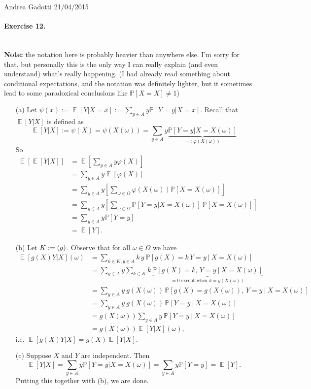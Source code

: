 \documentclass[12pt,a4paper]{report}
\theoremstyle{definition}
\theoremstyle{num.custom-title}
\let\o\relax %
\DeclareMathOperator{\o}{\mathsf{o}}
\let\Im\relax %
\DeclareMathOperator{\Im}{Im}
\DeclareMathOperator{\E}{\mathbb{E}}
\renewcommand{\phi}{\varphi}
\renewcommand{\1}{\mathbbm{1}}
\renewcommand{\P}{\mathbb{P}}
\begin{document}
\noindent Andrea Gadotti \hfill 21/04/2015

\paragraph{Exercise 12.}\ \\
\textbf{Note:} the notation here is probably heavier than anywhere else. I'm sorry for that, but personally this is the only way I can really explain (and even understand) what's really happening. (I had already read something about conditional expectations, and the notation was definitely lighter, but it sometimes lead to some paradoxical conclusions like $\P[X=X] \neq 1$)
\begin{itemize}
\item[(a)] Let $\psi(x) := \E[Y|X=x] := \sum_{y \in A} y \P[Y=y|X=x]$. Recall that $\E[Y|X]$ is defined as
\[
\E[Y|X] := \psi(X) = \psi(X(\omega)) = \sum_{y \in A} y \underbrace{\P[Y=y|X=X(\omega)]}_{=: \phi(X(\omega))} 
\]
So
\begin{align*}
\E[\E[Y|X]]
&= \E \left[ \sum_{y \in A} y \phi(X) \right] \\
&= \sum_{y \in A} y \E \left[ \phi(X) \right] \\
&= \sum_{y \in A} y \left[ \sum_{\omega \in \Omega} \phi(X(\omega)) \P[X=X(\omega)] \right]  \tag{law unconsc. statistician} \\
&= \sum_{y \in A} y \left[ \sum_{\omega \in \Omega} \P[Y=y|X=X(\omega)] \ \P[X=X(\omega)] \right] \\
&= \sum_{y \in A} y \P[Y=y] \tag{rule of tot. prob.} \\
&= \E[Y].
\end{align*}
\item[(b)] Let $K := \Im(g)$. Observe that for all $\omega \in \Omega$ we have
\begin{align*}
\E[g(X)Y|X](\omega) 
&= \sum_{k \in K, y \in A} k \, y \ \P[g(X) = k \, Y=y \ | \ X=X(\omega)] \\
&= \sum_{y \in A} y \sum_{k \in K} k \ \underbrace{\P[g(X) = k, \, Y=y \ | \ X=X(\omega)]}_{=0 \text{ except when } k=g(X(\omega))} \\
&= \sum_{y \in A} y \ g(X(\omega)) \, \P[g(X) = g(X(\omega)), \, Y=y \ | \ X=X(\omega)] \\
&= \sum_{y \in A} y \ g(X(\omega)) \, \P[Y=y \ | \ X=X(\omega)] \tag{immediate using def. of cond. prob.} \\
&= g(X(\omega)) \sum_{y \in A} y \ \P[Y = y \ | \ X=X(\omega)] \\
&= g(X(\omega)) \E[Y|X](\omega),
\end{align*}
i.e. $\E[g(X)Y|X] = g(X) \E[Y|X]$.
\item[(c)] Suppose $X$ and $Y$ are independent. Then
\[
\E[Y|X] = \sum_{y \in A} y \P[Y=y|X=X(\omega)] = \sum_{y \in A} y \P[Y=y] = \E[Y].
\]
Putting this together with (b), we are done.
\end{itemize}
\end{document}
